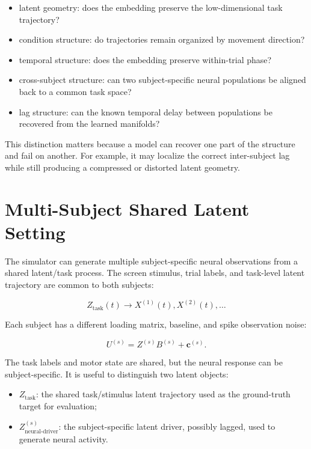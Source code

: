 \documentclass[11pt]{article}
\begin{document}
\begin{itemize}
    \item latent geometry: does the embedding preserve the low-dimensional task
    trajectory?
    \item condition structure: do trajectories remain organized by movement
    direction?
    \item temporal structure: does the embedding preserve within-trial phase?
    \item cross-subject structure: can two subject-specific neural populations
    be aligned back to a common task space?
    \item lag structure: can the known temporal delay between populations be
    recovered from the learned manifolds?
\end{itemize}

This distinction matters because a model can recover one part of the structure
and fail on another. For example, it may localize the correct inter-subject lag
while still producing a compressed or distorted latent geometry.

\section{Multi-Subject Shared Latent Setting}

The simulator can generate multiple subject-specific neural observations from a
shared latent/task process. The screen stimulus, trial labels, and task-level
latent trajectory are common to both subjects:

\begin{equation}
Z_{\text{task}}(t)
\rightarrow
X^{(1)}(t), X^{(2)}(t), \dots
\end{equation}

Each subject has a different loading matrix, baseline, and spike observation
noise:

\begin{equation}
U^{(s)} = Z^{(s)} B^{(s)} + \bm{c}^{(s)}.
\end{equation}

The task labels and motor state are shared, but the neural response can be
subject-specific. It is useful to distinguish two latent objects:

\begin{itemize}
    \item $Z_{\text{task}}$: the shared task/stimulus latent trajectory used as
    the ground-truth target for evaluation;
    \item $Z_{\text{neural-driver}}^{(s)}$: the subject-specific latent driver,
    possibly lagged, used to generate neural activity.
\end{itemize}
\end{document}
